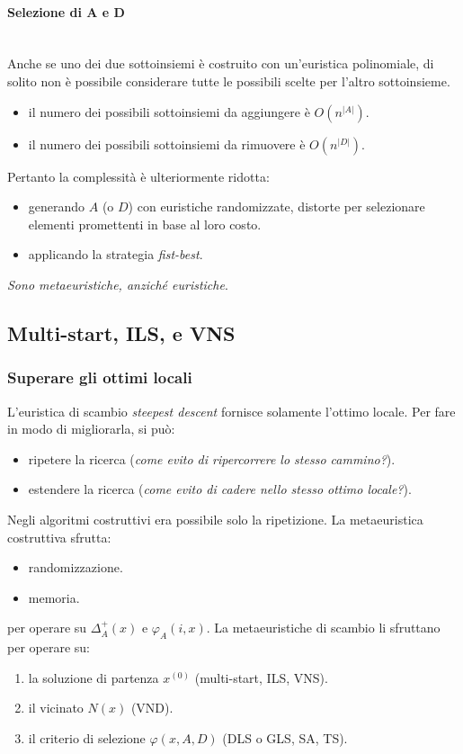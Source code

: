 \documentclass{article}
\begin{document}
\paragraph{Selezione di A e D}\mbox{}\\
Anche se uno dei due sottoinsiemi è costruito con un'euristica polinomiale, di solito
non è possibile considerare tutte le possibili scelte per l'altro sottoinsieme.
\begin{itemize}
    \item il numero dei possibili sottoinsiemi da aggiungere è $O(n^{|A|})$.
    \item il numero dei possibili sottoinsiemi da rimuovere è $O(n^{|D|})$.
\end{itemize}
Pertanto la complessità è ulteriormente ridotta:
\begin{itemize}
    \item generando $A$ (o $D$) con euristiche randomizzate, distorte per selezionare
    elementi promettenti in base al loro costo.
    \item applicando la strategia \textit{fist-best}.
\end{itemize}
\textit{Sono metaeuristiche, anziché euristiche}.


\subsection{Multi-start, ILS, e VNS}
\subsubsection{Superare gli ottimi locali}
L'euristica di scambio \textit{steepest descent} fornisce solamente l'ottimo locale. Per
fare in modo di migliorarla, si può:
\begin{itemize}
    \item ripetere la ricerca (\textit{come evito di ripercorrere lo stesso cammino?}).
    \item estendere la ricerca (\textit{come evito di cadere nello stesso ottimo locale?}).
\end{itemize}
Negli algoritmi costruttivi era possibile solo la ripetizione. La metaeuristica costruttiva
sfrutta:
\begin{itemize}
    \item randomizzazione.
    \item memoria.
\end{itemize}
per operare su $\Delta_A^+(x)$ e $\varphi_A(i,x)$. La metaeuristiche di scambio
li sfruttano per operare su:
\begin{enumerate}
    \item la soluzione di partenza $x^{(0)}$ (multi-start, ILS, VNS).
    \item il vicinato $N(x)$ (VND).
    \item il criterio di selezione $\varphi(x,A,D)$ (DLS o GLS, SA, TS).
\end{enumerate}
\end{document}
